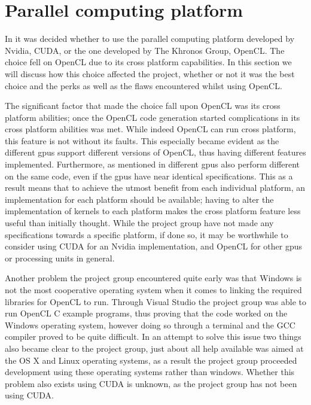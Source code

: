 \section{Parallel computing platform}
In  it was decided whether to use the parallel computing platform developed by Nvidia, CUDA, or the one developed by The Khronos Group, OpenCL.
The choice fell on OpenCL due to its cross platform capabilities.
In this section we will discuss how this choice affected the project, whether or not it was the best choice and the perks as well as the flaws encountered whilst using OpenCL.

The significant factor that made the choice fall upon OpenCL was its cross platform abilities; once the OpenCL code generation started complications in its cross platform abilities was met.
While indeed OpenCL can run cross platform, this feature is not without its faults.
This especially became evident as the different \acrshort{gpu}s support different versions of OpenCL, thus having different features implemented.
Furthermore, as mentioned in  different \acrshort{gpu}s also perform different on the same code, even if the \acrshort{gpu}s have near identical specifications.
This as a result means that to achieve the utmost benefit from each individual platform, an implementation for each platform should be available; having to alter the implementation of kernels to each platform makes the cross platform feature less useful than initially thought.
While the project group have not made any specifications towards a specific platform, if done so, it may be worthwhile to consider using CUDA for an Nvidia implementation, and OpenCL for other \acrshort{gpu}s or processing units in general.

Another problem the project group encountered quite early was that Windows is not the most cooperative operating system when it comes to linking the required libraries for OpenCL to run.
Through Visual Studio the project group was able to run OpenCL C example programs, thus proving that the code worked on the Windows operating system, however doing so through a terminal and the GCC compiler proved to be quite difficult.
In an attempt to solve this issue two things also became clear to the project group, just about all help available was aimed at the OS X and Linux operating systems, as a result the project group proceeded development using these operating systems rather than windows.
Whether this problem also exists using CUDA is unknown, as the project group has not been using CUDA.
%

